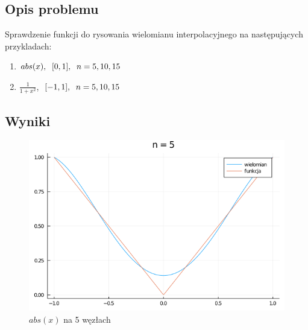 \documentclass[12pt]{article}
\begin{document}
\subsection{Opis problemu}
Sprawdzenie funkcji do rysowania wielomianu interpolacyjnego na następujących przykladach:
\begin{enumerate}
    \item $abs(x),\hspace{0.2cm} [0,1],\hspace{0.2cm} n = 5, 10, 15$
    \item $\frac{1}{1+x^2}$,$\hspace{0.2cm} [-1,1],\hspace{0.2cm} n = 5, 10, 15$
\end{enumerate}

\subsection{Wyniki}
\begin{figure}[h!]
    \caption{$abs(x)$ na 5 węzłach}
    \centering
    \includegraphics[scale=0.5]{z6f_5.png}
\end{figure}
\end{document}
